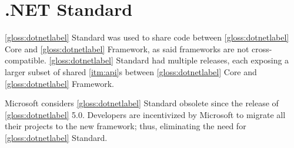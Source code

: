\section{.NET Standard}
\ref{gloss:dotnetlabel} Standard was used to share code between \ref{gloss:dotnetlabel} Core and \ref{gloss:dotnetlabel} Framework, as said frameworks are not cross-compatible. \ref{gloss:dotnetlabel} Standard had multiple releases, each exposing a larger subset of shared \ref{itm:api}s between \ref{gloss:dotnetlabel} Core and \ref{gloss:dotnetlabel} Framework.

Microsoft considers \ref{gloss:dotnetlabel} Standard obsolete since the release of \ref{gloss:dotnetlabel} 5.0. Developers are incentivized by Microsoft to migrate all their projects to the new framework; thus, eliminating the need for \ref{gloss:dotnetlabel} Standard.